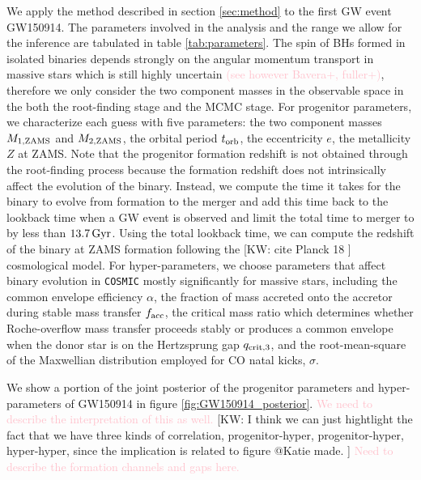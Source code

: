 \documentclass[twocolumn]{aastex631}
\newcommand{\kw}[1]{{\color{rb4}[KW: #1 ]}}
\newcommand{\kb}[1]{\textcolor{pink}{#1}}
\begin{document}
We apply the method described in section \ref{sec:method} to the first GW event GW150914.
The parameters involved in the analysis and the range we allow for the inference are tabulated in table \ref{tab:parameters}.
The spin of BHs formed in isolated binaries depends strongly on the angular 
momentum transport in massive stars which is still highly uncertain \kb{(see however Bavera+, fuller+)},
therefore we only consider the two component masses in the observable space in the both the 
root-finding stage and the MCMC stage. For progenitor parameters, we characterize each guess with 
five parameters: the two component masses $M_{\rm 1,ZAMS}$ and $M_{\rm 2,ZAMS}$, the orbital period $t_{\rm orb}$, 
the eccentricity $e$, the metallicity $Z$ at ZAMS. Note that the progenitor formation redshift is not 
obtained through the root-finding process because the formation redshift does not intrinsically affect 
the evolution of the binary. Instead, we compute the time it takes for the binary to evolve from 
formation to the merger and add this time back to the lookback time when a GW event is observed and limit the total 
time to merger to by less than $13.7\,\rm{Gyr}$.
Using the total lookback time, we can compute the redshift of the binary at ZAMS formation following the 
\kw{cite Planck 18} cosmological model. For hyper-parameters, we choose parameters that affect 
binary evolution in \texttt{COSMIC} mostly significantly for massive stars, including the common envelope 
efficiency $\alpha$, the fraction of mass accreted onto the accretor during stable mass transfer $f_{\rm acc}$, 
the critical mass ratio which determines whether Roche-overflow mass transfer 
proceeds stably or produces a common envelope when the donor star is on the Hertzsprung gap 
$q_{\rm crit,3}$, and the root-mean-square of the Maxwellian distribution
employed for CO natal kicks, $\sigma$. 

We show a portion of the joint posterior of the progenitor parameters 
and hyper-parameters of GW150914 in figure \ref{fig:GW150914_posterior}.
\kb{We need to describe the interpretation of this as well.}
\kw{I think we can just hightlight the fact that we have three kinds of correlation, progenitor-hyper, progenitor-hyper, hyper-hyper,
since the implication is related to figure @Katie made.}
\kb{Need to describe the formation channels and gaps here.}
\end{document}
